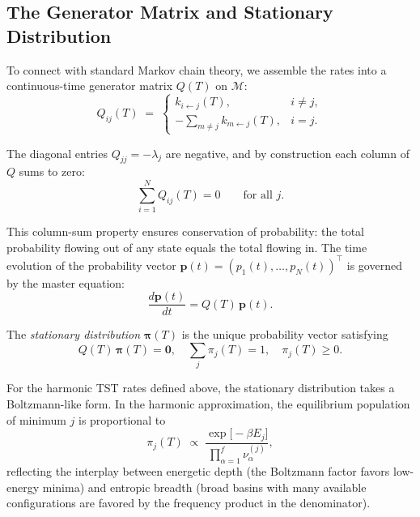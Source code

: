 \subsection{The Generator Matrix and Stationary Distribution}\label{subsec:generator}

To connect with standard Markov chain theory, we assemble the rates into
a continuous-time generator matrix $Q(T)$ on $\mathcal{M}$:
\begin{equation}\label{eq:Q-def}
  Q_{ij}(T) \;=\;
  \begin{cases}
    k_{i\leftarrow j}(T), & i\neq j,\\[4pt]
    -\displaystyle\sum_{m\neq j} k_{m\leftarrow j}(T), & i = j.
  \end{cases}
\end{equation}

The diagonal entries $Q_{jj} = -\lambda_j$ are negative, and by construction each
column of $Q$ sums to zero:
\begin{equation}\label{eq:generator-colsum}
  \sum_{i=1}^{N} Q_{ij}(T) = 0 \qquad \text{for all } j.
\end{equation}

This column-sum property ensures conservation of probability: the total probability
flowing out of any state equals the total flowing in. The time evolution of the
probability vector $\mathbf{p}(t) = (p_1(t), \ldots, p_N(t))^\top$ is governed by the
master equation:
\begin{equation}\label{eq:master}
  \frac{d\mathbf{p}(t)}{dt} = Q(T)\,\mathbf{p}(t).
\end{equation}

The \emph{stationary distribution} $\boldsymbol{\pi}(T)$ is the unique probability
vector satisfying
\begin{equation}\label{eq:stationary-dist}
  Q(T)\,\boldsymbol{\pi}(T) = \mathbf{0}, \quad
  \sum_j \pi_j(T) = 1, \quad \pi_j(T) \ge 0.
\end{equation}

For the harmonic TST rates defined above, the stationary distribution takes a
Boltzmann-like form. In the harmonic approximation, the equilibrium population of
minimum $j$ is proportional to
\begin{equation}\label{eq:stationary-dist-explicit}
  \pi_j(T) \;\propto\; \frac{\exp\bigl[-\beta E_j\bigr]}
  {\prod_{\alpha=1}^{f} \nu_\alpha^{(j)}},
\end{equation}
reflecting the interplay between energetic depth (the Boltzmann factor favors
low-energy minima) and entropic breadth (broad basins with many available
configurations are favored by the frequency product in the denominator).

